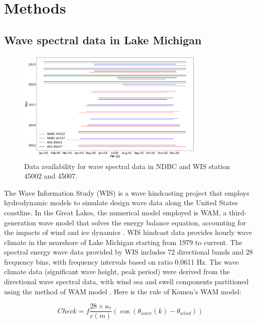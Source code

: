 \section{Methods}
\label{c4_methods}

\subsection{Wave spectral data in Lake Michigan}
\label{Wave spectral data in Lake Michigan}

\begin{figure}[htbp]
  \centering
  \includegraphics[width=0.8\textwidth]{chapter4/resources/figure4-2.png}
  \caption{Data availability for wave spectral data in NDBC and WIS station 45002 and 45007.}
  \label{fig:fig4.2}
\end{figure}

The Wave Information Study (WIS) is a wave hindcasting project that employs
hydrodynamic models to simulate design wave data along the United States
coastline. In the Great Lakes, the numerical model employed is WAM, a
third-generation wave model that solves the energy balance equation, accounting
for the impacts of wind and ice dynamics \citep{jensen_lake_2012}. WIS hindcast
data provides hourly wave climate in the nearshore of Lake Michigan starting
from 1979 to current. The spectral energy wave data provided by WIS includes 72
directional bands and 28 frequency bins, with frequency intervals based on ratio
0.0611 Hz. The wave climate data (\eg significant wave height, peak period) were
derived from the directional wave spectral data, with wind sea and swell
components partitioned using the method of WAM model
\citep{komen_dynamics_1994}. Here is the rule of Komen's WAM model:

\begin{equation}
    Check = f\frac{28\times u_*}{c(m)}(\cos(\theta_{wave}(k)-\theta_{wind}))
\label{eq:eq4.1}
\end{equation}

